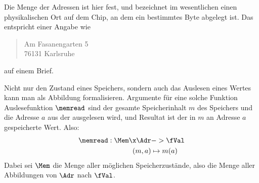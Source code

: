 Die Menge der Adressen ist hier fest, und bezeichnet im wesentlichen
einen physikalischen Ort auf dem Chip, an dem ein bestimmtes Byte
abgelegt ist. Das entspricht einer Angabe wie
%
\begin{quote}
  Am Fasanengarten 5\\
  76131 Karlsruhe
\end{quote}
%
auf einem Brief.

Nicht nur den Zustand eines Speichers, sondern auch das Auslesen eines
Wertes kann man als Abbildung formalisieren. Argumente für eine solche
Funktion Auslesefunktion $\memread$ sind der gesamte Speicherinhalt
$m$ des Speichers und die Adresse $a$ aus der ausgelesen wird, und
Resultat ist der in $m$ an Adresse $a$ gespeicherte Wert. Also:
%
\begin{align*}
  \memread : \Mem \x \Adr &-> \fVal \\
             (m,a) &\mapsto m(a) \\
\end{align*}
%
Dabei sei $\Mem$ die Menge aller möglichen Speicherzustände, also die
Menge aller Abbildungen von $\Adr$ nach $\fVal$.

